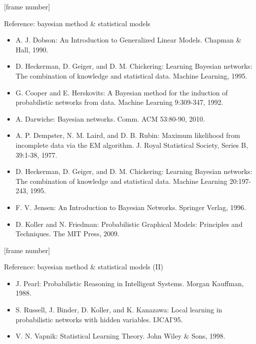 \documentclass[aspectratio=169,t,table]{beamer}
\begin{document}
  {
    [frame number]
    \begin{frame}{Reference: bayesian method \& statistical models}
      \begin{itemize}
        \item A. J. Dobson: An Introduction to Generalized Linear Models. Chapman \& Hall, 1990.
        \item D. Heckerman, D. Geiger, and D. M. Chickering: Learning Bayesian networks: The combination of knowledge and statistical data. Machine Learning, 1995.
        \item G. Cooper and E. Herskovits: A Bayesian method for the induction of probabilistic networks from data. Machine Learning 9:309-347, 1992.
        \item A. Darwiche: Bayesian networks. Comm. ACM 53:80-90, 2010.
        \item A. P. Dempster, N. M. Laird, and D. B. Rubin: Maximum likelihood from incomplete data via the EM algorithm. J. Royal Statistical Society, Series B, 39:1-38, 1977.
        \item D. Heckerman, D. Geiger, and D. M. Chickering: Learning Bayesian networks: The combination of knowledge and statistical data. Machine Learning 20:197-243, 1995.
        \item F. V. Jensen: An Introduction to Bayesian Networks. Springer Verlag, 1996.
        \item D. Koller and N. Friedman: Probabilistic Graphical Models: Principles and Techniques. The MIT Press, 2009.
      \end{itemize}
    \end{frame}
  }

  {
    [frame number]
    \begin{frame}{Reference: bayesian method \& statistical models (II)}
      \begin{itemize}
        \item J. Pearl: Probabilistic Reasoning in Intelligent Systems. Morgan Kauffman, 1988.
        \item S. Russell, J. Binder, D. Koller, and K. Kanazawa: Local learning in probabilistic networks with hidden variables. IJCAI'95.
        \item V. N. Vapnik: Statistical Learning Theory. John Wiley \& Sons, 1998.
      \end{itemize}
    \end{frame}
  }
\end{document}
